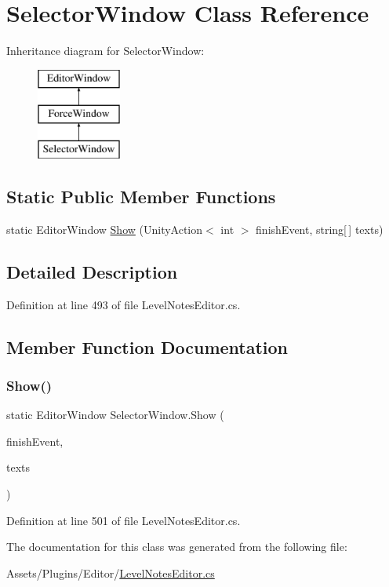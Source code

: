 \hypertarget{class_selector_window}{}\section{Selector\+Window Class Reference}
\label{class_selector_window}
Inheritance diagram for Selector\+Window\+:\begin{figure}[H]
\begin{center}
\leavevmode
\includegraphics[height=3.000000cm]{class_selector_window}
\end{center}
\end{figure}
\subsection*{Static Public Member Functions}
\begin{DoxyCompactItemize}
\item 
static Editor\+Window \mbox{\hyperlink{class_selector_window_af77885c8fe0b7fe9b0069baa8cd7329a}{Show}} (Unity\+Action$<$ int $>$ finish\+Event, string\mbox{[}$\,$\mbox{]} texts)
\end{DoxyCompactItemize}


\subsection{Detailed Description}


Definition at line 493 of file Level\+Notes\+Editor.\+cs.



\subsection{Member Function Documentation}
\mbox{\label{class_selector_window_af77885c8fe0b7fe9b0069baa8cd7329a}} 
\subsubsection{\texorpdfstring{Show()}{Show()}}
{\footnotesize\ttfamily static Editor\+Window Selector\+Window.\+Show (\begin{DoxyParamCaption}\item[{Unity\+Action$<$ int $>$}]{finish\+Event,  }\item[{string \mbox{[}$\,$\mbox{]}}]{texts }\end{DoxyParamCaption})\hspace{0.3cm}{\ttfamily [static]}}



Definition at line 501 of file Level\+Notes\+Editor.\+cs.



The documentation for this class was generated from the following file\+:\begin{DoxyCompactItemize}
\item 
Assets/\+Plugins/\+Editor/\mbox{\hyperlink{_level_notes_editor_8cs}{Level\+Notes\+Editor.\+cs}}\end{DoxyCompactItemize}
